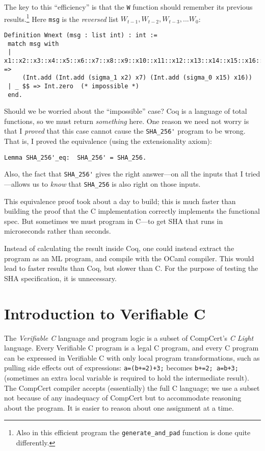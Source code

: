 \documentclass[prodmode,acmtoplas]{acmsmall}
\begin{document}
The key to this ``efficiency'' is that
the \lstinline{W} function should remember
its previous results.\footnote{Also in this efficient program the
\lstinline{generate_and_pad} function is done quite differently.}
Here \lstinline{msg}
is the \emph{reversed} list \linebreak[3]
$W_{t-1},W_{t-2},W_{t-3},...W_0$:
\begin{lstlisting}
Definition Wnext (msg : list int) : int :=
 match msg with
 | x1::x2::x3::x4::x5::x6::x7::x8::x9::x10::x11::x12::x13::x14::x15::x16::_ =>
     (Int.add (Int.add (sigma_1 x2) x7) (Int.add (sigma_0 x15) x16))
 | _ $$ => Int.zero  (* impossible *)
 end.
\end{lstlisting}
Should we be worried about the ``impossible'' case?
Coq is a language of total functions, so we must return \emph{something}
here. One reason we need not worry is that
I \emph{proved} that this case cannot cause the
\lstinline{SHA_256'} program to be wrong.
That is, I proved the equivalence (using the extensionality axiom):
\begin{lstlisting}
Lemma SHA_256'_eq:  SHA_256' = SHA_256.
\end{lstlisting}

Also, the fact that \lstinline{SHA_256'}
gives the right answer---on all the inputs that
I tried---allows us to \emph{know} that
\lstinline{SHA_256} is also right on those inputs.

This equivalence proof took about a day to build;
this is much faster than building the proof
that the C implementation correctly implements
the functional spec.  But sometimes we must
program in C---to get SHA that runs
in microseconds rather than seconds.

Instead of calculating the result inside Coq,
one could instead extract the program as an
ML program, and compile with the OCaml compiler.
This would lead to faster results than
Coq, but slower than C.
For the purpose of testing the SHA specification,
it is unnecessary.

\section{Introduction to Verifiable C}

The \emph{Verifiable C} language and program logic
is a subset of CompCert's \emph{C Light} 
language.  Every Verifiable C
program is a legal C program,
and every C program can be expressed in Verifiable C
with only local program transformations,
such as pulling side effects out of expressions:
\lstinline{a=(b+=2)+3;}
becomes 
\lstinline{b+=2; a=b+3;}
(sometimes an extra local variable is required 
to hold the intermediate result).
The CompCert compiler accepts (essentially)
the full C language; we use a subset
not because of any inadequacy of CompCert
but to accommodate reasoning about the program.
It is easier to reason about one assignment
at a time.
\end{document}
